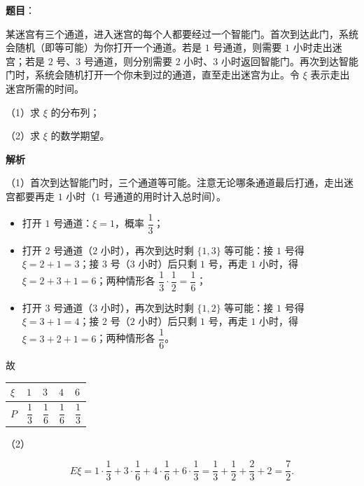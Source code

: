 \begin{answer}

\textbf{题目}：

某迷宫有三个通道，进入迷宫的每个人都要经过一个智能门。首次到达此门，系统会随机（即等可能）为你打开一个通道。若是 $1$ 号通道，则需要 $1$ 小时走出迷宫；若是 $2$ 号、$3$ 号通道，则分别需要 $2$ 小时、$3$ 小时返回智能门。再次到达智能门时，系统会随机打开一个你未到过的通道，直至走出迷宫为止。令 $\xi$ 表示走出迷宫所需的时间。

（1）求 $\xi$ 的分布列；

（2）求 $\xi$ 的数学期望。

\textbf{解析}

（1）首次到达智能门时，三个通道等可能。注意无论哪条通道最后打通，走出迷宫都要再走 $1$ 小时（$1$ 号通道的用时计入总时间）。

\begin{itemize}
\item 打开 $1$ 号通道：$\xi=1$，概率 $\dfrac13$；
\item 打开 $2$ 号通道（$2$ 小时），再次到达时剩 $\{1,3\}$ 等可能：接 $1$ 号得 $\xi=2+1=3$；接 $3$ 号（$3$ 小时）后只剩 $1$ 号，再走 $1$ 小时，得 $\xi=2+3+1=6$；两种情形各 $\dfrac13\cdot\dfrac12=\dfrac16$；
\item 打开 $3$ 号通道（$3$ 小时），再次到达时剩 $\{1,2\}$ 等可能：接 $1$ 号得 $\xi=3+1=4$；接 $2$ 号（$2$ 小时）后只剩 $1$ 号，再走 $1$ 小时，得 $\xi=3+2+1=6$；两种情形各 $\dfrac16$。
\end{itemize}

故

\begin{center}
\begin{tabular}{lllll}
\toprule
$\xi$ & $1$ & $3$ & $4$ & $6$ \\
\midrule
$P$ & $\dfrac13$ & $\dfrac16$ & $\dfrac16$ & $\dfrac13$ \\
\bottomrule
\end{tabular}
\end{center}

（2）

\nopagebreak[4]
\[E\xi=1\cdot\frac13+3\cdot\frac16+4\cdot\frac16+6\cdot\frac13
=\frac13+\frac12+\frac23+2=\frac72.\]


\end{answer}
